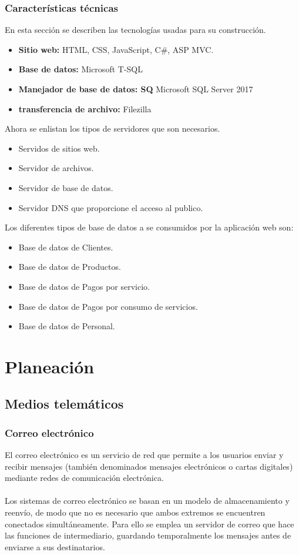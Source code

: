 \documentclass[12pt,letterpaper]{article}
\begin{document}
\subsubsection{Características técnicas}
En esta sección se describen las tecnologías usadas para su construcción.
\begin{itemize}
    \item \textbf{Sitio web:} HTML, CSS, JavaScript, C\#, ASP MVC.
    \item \textbf{Base de datos: } Microsoft T-SQL
    \item \textbf{Manejador de base de datos: SQ} Microsoft SQL Server 2017
    \item \textbf{transferencia de archivo: } Filezilla
\end{itemize}
Ahora se enlistan los tipos de servidores que son necesarios.
\begin{itemize}
    \item Servidos de sitios web.
    \item Servidor de archivos.
    \item Servidor de base de datos.
    \item Servidor DNS que proporcione el acceso al publico.
\end{itemize}
Los diferentes tipos de base de datos a se consumidos por la aplicación web son:
\begin{itemize}
    \item Base de datos de Clientes.
    \item Base de datos de Productos.
    \item Base de datos de Pagos por servicio.
    \item Base de datos de Pagos por consumo de servicios.
    \item Base de datos de Personal.
\end{itemize}

\newpage
\section{Planeación}
\subsection{Medios telemáticos}
\subsubsection{Correo electrónico}
El correo electrónico es un servicio de red que permite a los usuarios enviar y recibir 
mensajes (también denominados mensajes electrónicos o cartas digitales) mediante redes de 
comunicación electrónica.
\\ \\
Los sistemas de correo electrónico se basan en un modelo de almacenamiento y reenvío, de 
modo que no es necesario que ambos extremos se encuentren conectados simultáneamente. 
Para ello se emplea un servidor de correo que hace las funciones de intermediario, guardando 
temporalmente los mensajes antes de enviarse a sus destinatarios. \cite{email}
\end{document}
